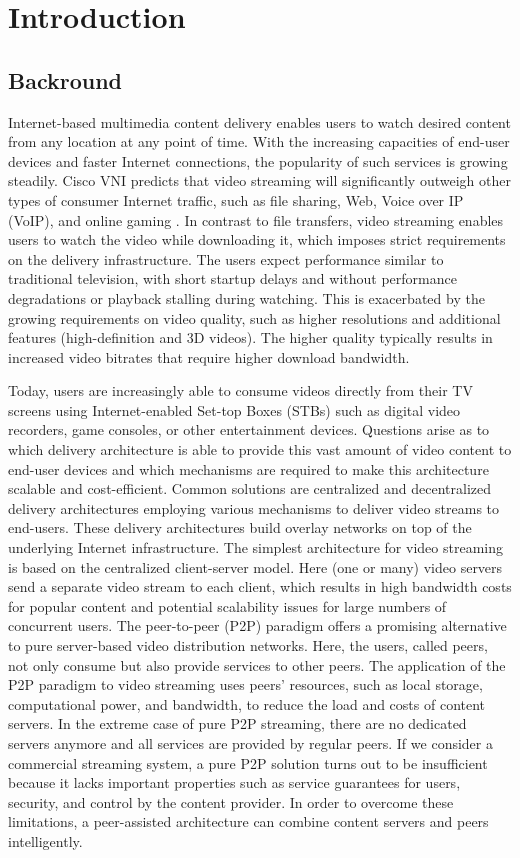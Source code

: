 \chapter{Introduction}
\section{Backround}
Internet-based multimedia content delivery enables users to watch desired content from any location at any point of time. 
With the increasing capacities of end-user devices and faster Internet connections, the popularity of such services is growing steadily. 
Cisco VNI predicts that video streaming will significantly outweigh other types of consumer Internet traffic, such as file sharing, Web, Voice over IP (VoIP), and online gaming \cite{ciscovni}. 
In contrast to file transfers, video streaming enables users to watch the video while downloading it, which imposes strict requirements on the delivery infrastructure. 
The users expect performance similar to traditional television, with short startup delays and without performance degradations or playback stalling during watching. This is exacerbated by the growing requirements on video quality, such as higher resolutions and additional features (high-definition and 3D videos). 
The higher quality typically results in increased video bitrates that require higher download bandwidth.

Today, users are increasingly able to consume videos directly from their TV screens using Internet-enabled Set-top Boxes (STBs) such as digital video recorders, game consoles, or other entertainment devices. 
Questions arise as to which delivery architecture is able to provide this vast amount of video content to end-user devices and which mechanisms are required to make this architecture scalable and cost-efficient. 
Common solutions are centralized and decentralized delivery architectures employing various mechanisms to deliver video streams to end-users. 
These delivery architectures build overlay networks on top of the underlying Internet infrastructure.
The simplest architecture for video streaming is based on the centralized client-server model. Here (one or many) video servers send a separate video stream to each client, which results in high bandwidth costs for popular content and potential scalability issues for large numbers of concurrent users. 
The peer-to-peer (P2P) paradigm offers a promising alternative to pure server-based video distribution networks. 
Here, the users, called peers, not only consume but also provide services to other peers. The application of the P2P paradigm to video streaming uses peers’ resources, such as local storage, computational power, and bandwidth, to reduce the load and costs of content servers. In the extreme case of pure P2P streaming, there are no dedicated servers anymore and all services are provided by regular peers.
If we consider a commercial streaming system, a pure P2P solution turns out to be insufficient because it lacks important properties such as service guarantees for users, security, and control by the content provider. 
In order to overcome these limitations, a peer-assisted architecture can combine content servers and peers intelligently.

